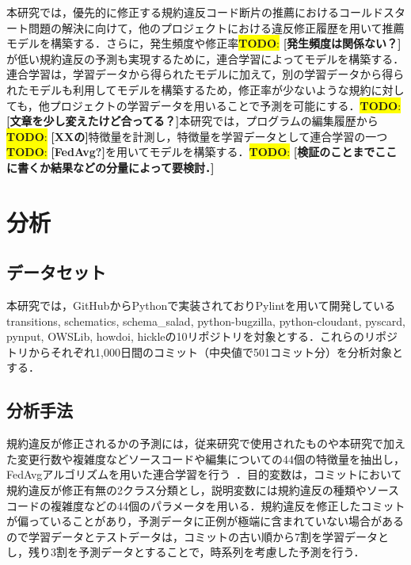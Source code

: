 \documentclass[uplatex,dvipdfmx,a4paper,twocolumn,base=11pt,jbase=11pt,ja=standard]{bxjsarticle}  %
\newcommand{\todo}[1]{\colorbox{yellow}{{\bf TODO}:}{\color{red} {\textbf{[#1]}}}}
\begin{document}
本研究では，優先的に修正する規約違反コード断片の推薦におけるコールドスタート問題の解決に向けて，他のプロジェクトにおける違反修正履歴を用いて推薦モデルを構築する．さらに，発生頻度や修正率\todo{発生頻度は関係ない？}が低い規約違反の予測も実現するために，連合学習によってモデルを構築する．連合学習は，学習データから得られたモデルに加えて，別の学習データから得られたモデルも利用してモデルを構築するため，修正率が少ないような規約に対しても，他プロジェクトの学習データを用いることで予測を可能にする．\todo{文章を少し変えたけど合ってる？}本研究では，プログラムの編集履歴から\todo{XXの}特徴量を計測し，特徴量を学習データとして連合学習の一つ\todo{FedAvg?}を用いてモデルを構築する．\todo{検証のことまでここに書くか結果などの分量によって要検討．}


\section{分析}







\subsection{データセット}
本研究では，GitHubからPythonで実装されておりPylintを用いて開発しているtransitions, schematics, schema\_salad, python-bugzilla, python-cloudant, pyscard, pynput, OWSLib, howdoi, hickleの10リポジトリを対象とする．これらのリポジトリからそれぞれ1,000日間のコミット（中央値で501コミット分）を分析対象とする．

\subsection{分析手法}
規約違反が修正されるかの予測には，従来研究で使用されたものや本研究で加えた変更行数や複雑度などソースコードや編集についての44個の特徴量を抽出し，FedAvgアルゴリズムを用いた連合学習を行う~\cite{article2}．目的変数は，コミットにおいて規約違反が修正有無の2クラス分類とし，説明変数には規約違反の種類やソースコードの複雑度などの44個のパラメータを用いる．規約違反を修正したコミットが偏っていることがあり，予測データに正例が極端に含まれていない場合があるので学習データとテストデータは，コミットの古い順から7割を学習データとし，残り3割を予測データとすることで，時系列を考慮した予測を行う．
\end{document}
